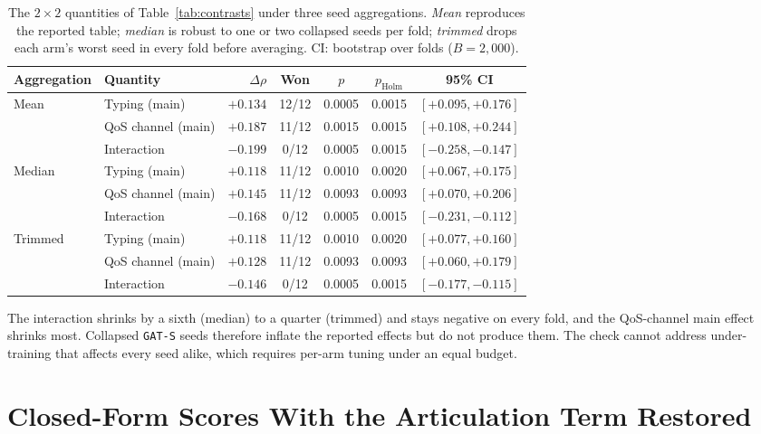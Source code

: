 \documentclass[preprint,3p]{elsarticle}
\begin{document}
\begin{table}[htbp]
\centering
\small
\caption{The $2\times2$ quantities of Table~\ref{tab:contrasts} under three seed aggregations. \emph{Mean} reproduces the reported table; \emph{median} is robust to one or two collapsed seeds per fold; \emph{trimmed} drops each arm's worst seed in every fold before averaging. CI: bootstrap over folds ($B = 2{,}000$).}
\label{tab:supp-seed-robust}
\begin{tabular}{llrcccc}
\toprule
\textbf{Aggregation} & \textbf{Quantity} & \textbf{$\Delta\rho$} & \textbf{Won} & \textbf{$p$} & \textbf{$p_{\text{Holm}}$} & \textbf{95\% CI} \\
\midrule
Mean & Typing (main) & $+0.134$ & 12/12 & 0.0005 & 0.0015 & $[+0.095, +0.176]$ \\
 & QoS channel (main) & $+0.187$ & 11/12 & 0.0015 & 0.0015 & $[+0.108, +0.244]$ \\
 & Interaction & $-0.199$ & 0/12 & 0.0005 & 0.0015 & $[-0.258, -0.147]$ \\
\midrule
Median & Typing (main) & $+0.118$ & 11/12 & 0.0010 & 0.0020 & $[+0.067, +0.175]$ \\
 & QoS channel (main) & $+0.145$ & 11/12 & 0.0093 & 0.0093 & $[+0.070, +0.206]$ \\
 & Interaction & $-0.168$ & 0/12 & 0.0005 & 0.0015 & $[-0.231, -0.112]$ \\
\midrule
Trimmed & Typing (main) & $+0.118$ & 11/12 & 0.0010 & 0.0020 & $[+0.077, +0.160]$ \\
 & QoS channel (main) & $+0.128$ & 11/12 & 0.0093 & 0.0093 & $[+0.060, +0.179]$ \\
 & Interaction & $-0.146$ & 0/12 & 0.0005 & 0.0015 & $[-0.177, -0.115]$ \\
\bottomrule
\end{tabular}
\end{table}

\noindent The interaction shrinks by a sixth (median) to a quarter (trimmed) and stays negative on every fold, and the QoS-channel main effect shrinks most. Collapsed \texttt{GAT-S} seeds therefore inflate the reported effects but do not produce them. The check cannot address under-training that affects every seed alike, which requires per-arm tuning under an equal budget.


\section{Closed-Form Scores With the Articulation Term Restored}
\label{supp:ap-sensitivity}
\end{document}
